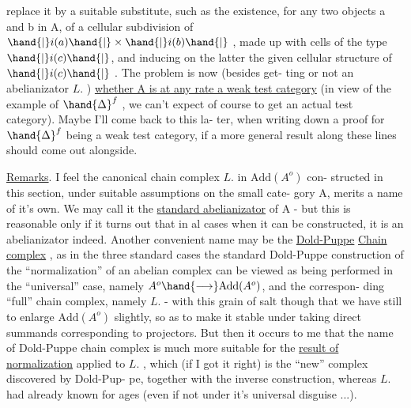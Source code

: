 replace it by a suitable substitute,  such as the existence,  for any
two objects a and b in A,  of a cellular subdivision of $\hand{|}i(a)\hand{|}\times\hand{|}i(b)\hand{|}$ ,
made up with cells of the type $\hand{|}i(c)\hand{|}$,  and inducing on the latter the
given cellular structure of $\hand{|}i(c)\hand{|}$ .  The problem is now (besides get-%
ting or not an abelianizator $L.$ )  \uline{whether A is at any rate a weak test
category}  (in view of the example of $\hand{\Delta}^{f}$ ,  we can't expect of course
 to get an actual test category).  Maybe I'll come back to this la-%
ter,  when writing down a proof for $\hand{\Delta}^{f}$  being a weak test category,  if
a more general result along these lines should come out alongside.

\uline{Remarks}.    I feel the canonical chain complex $L.$  in  $\mathrm{Add}(A^{o})$  con-%
structed in this section,  under suitable assumptions on the small cate-%
gory A,  merits a name of it's own.  We may call it the \uline{standard
abelianizator}  of A  -  but this is reasonable only if it turns out that
in al cases when it can be constructed,  it is an abelianizator indeed.
Another convenient name may be the \uline{Dold-Puppe} \uline{Chain complex} ,  as 
in the three standard cases\hand{,} the standard Dold-Puppe construction of the
``normalization''  of an abelian complex can be viewed as being performed
in the ``universal'' case,  namely   $A^{o} \hand{\longrightarrow} \mathrm{Add}(A^{o})$,  and the correspon-%
ding ``full'' chain complex,  namely  $L.$  -  with this  grain of
salt though that we have still to enlarge  $\mathrm{Add}(A^{o})$ slightly,  so as to
make it stable under taking direct summands corresponding to projectors.
But then it occurs to me that the name of Dold-Puppe chain complex is
much more suitable for the \uline{result of normalization}  applied to $L.$  ,
\margin{$\uparrow$}which (if I got it right)  is the ``new'' complex discovered by Dold-Pup-%
pe,  together with the inverse construction,  whereas $L.$  had already 
known for ages (even if not under it's universal disguise ...).

